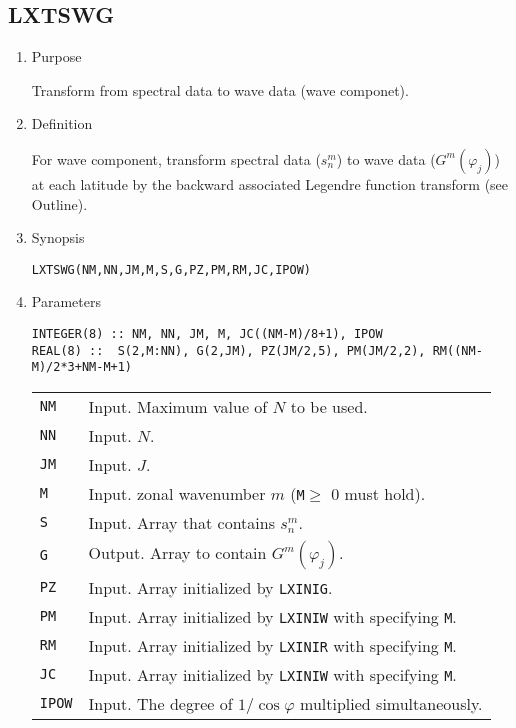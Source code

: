 \documentclass[a4paper]{scrartcl}
\begin{document}

\subsection{LXTSWG}

\begin{enumerate}

\item Purpose 

Transform from spectral data to wave data (wave componet).
  
\item Definition

For wave component, transform spectral data ($s^m_n$) 
to wave data ($G^m(\varphi_j)$) at each latitude
by the backward associated Legendre function transform (see Outline).

\item Synopsis 

\texttt{LXTSWG(NM,NN,JM,M,S,G,PZ,PM,RM,JC,IPOW)}
  
\item Parameters

\begin{verbatim}
INTEGER(8) :: NM, NN, JM, M, JC((NM-M)/8+1), IPOW
REAL(8) ::  S(2,M:NN), G(2,JM), PZ(JM/2,5), PM(JM/2,2), RM((NM-M)/2*3+NM-M+1)
\end{verbatim}
  
\begin{tabular}{ll}
\texttt{NM} & Input. Maximum value of $N$ to be used.\\
\texttt{NN} & Input. $N$.\\
\texttt{JM} & Input. $J$.\\
\texttt{M} & Input. zonal wavenumber $m$ 
(\texttt{M}$\ge$ 0 must hold).\\
\texttt{S} & Input. Array that contains $s^m_n$.\\
\texttt{G} & Output. Array to contain $G^m(\varphi_j)$.\\
\texttt{PZ}  & Input. Array initialized by \texttt{LXINIG}.\\
\texttt{PM}  & Input. Array initialized by \texttt{LXINIW}
with specifying \texttt{M}.\\
\texttt{RM} & Input. Array initialized by \texttt{LXINIR}
with specifying \texttt{M}.\\
\texttt{JC} & Input. Array initialized by \texttt{LXINIW}
with specifying \texttt{M}.\\
\texttt{IPOW} & Input. 
The degree of $1/\cos\varphi$ multiplied 
simultaneously.\\
\end{tabular}


\end{enumerate}
\end{document}
